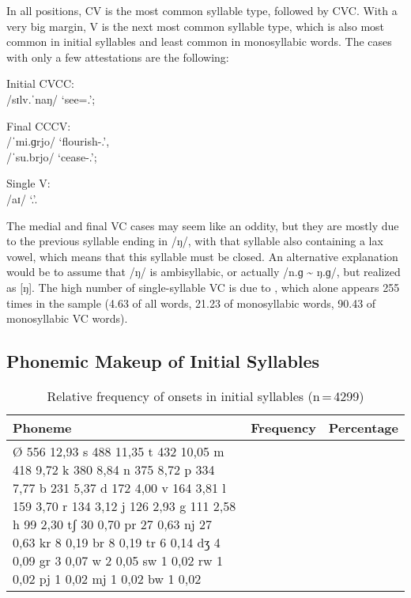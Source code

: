 In all positions, CV is the most common syllable type, followed by CVC. With a 
very big margin, V is the next most common syllable type, which is also most 
common in initial syllables and least common in monosyllabic words. The cases 
with only a few attestations are the following:

\pex
	\a Initial CVCC:\\
		 /sɪlv.ˈnaŋ/ `see=\Fpl{}.\Aarg{}';
		
	\a Final CCCV:\\
		 /ˈmi.ɡrjo/ `flourish-\Tsg{}.\N{}',\\
		 /ˈsu.brjo/ `cease-\Tsg{}.\N{}';
	
	\a Single V:\\
		 /aɪ/ `\Fsg{}.\Top{}'.
\xe

The medial and final VC cases may seem like an oddity, but they are mostly due 
to the previous syllable ending in /ŋ/, with that syllable also containing a 
lax vowel, which means that this syllable must be closed. An alternative 
explanation would be to assume that /ŋ/ is ambisyllabic, or actually /n.ɡ 
\textasciitilde{} ŋ.ɡ/, but realized as [ŋ]. The high number of single-syllable 
VC is due to , which alone appears 255 times in the 
sample (4.63\pct{} of all words, 21.23\pct{} of monosyllabic words, 90.43\pct{} 
of monosyllabic VC words).

\subsection{Phonemic Makeup of Initial Syllables}

\begin{table}[hp]\centering
\caption[Relative frequency of onsets in initial syllables]{Relative frequency of onsets in initial syllables (n\,=\,4299)}
\begin{tabu} to 0.5\textwidth{X X[c] X[c]}
\tableheaderfont\toprule
Phoneme
	& Frequency
	& Percentage
	\\
	
\toprule

Ø	556	12,93%
s	488	11,35%
t	432	10,05%
m	418	9,72%
k	380	8,84%
n	375	8,72%
p	334	7,77%
b	231	5,37%
d	172	4,00%
v	164	3,81%
l	159	3,70%
r	134	3,12%
j	126	2,93%
g	111	2,58%
h	99	2,30%
tʃ	30	0,70%
pr	27	0,63%
nj	27	0,63%
kr	8	0,19%
br	8	0,19%
tr	6	0,14%
dʒ	4	0,09%
gr	3	0,07%
w	2	0,05%
sw	1	0,02%
rw	1	0,02%
pj	1	0,02%
mj	1	0,02%
bw	1	0,02%

\bottomrule
\end{tabu}
\label{tab:initon}
\end{table}

